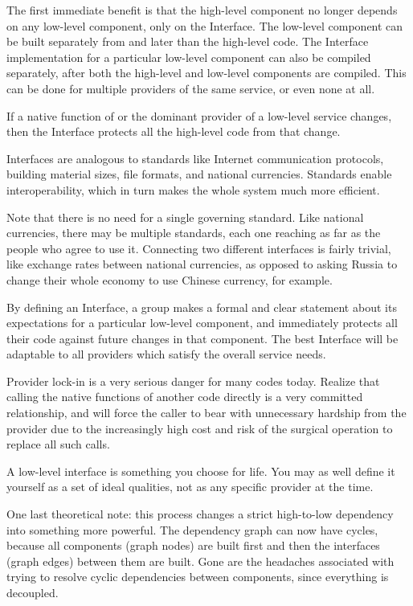\documentclass{article}
\begin{document}
The first immediate benefit is that the high-level component no longer depends
on any low-level component, only on the Interface.
The low-level component can be built separately from and later than
the high-level code.
The Interface implementation for a particular low-level component can also
be compiled separately, after both the high-level and low-level components
are compiled.
This can be done for multiple providers of the same service, or even none at
all.

If a native function of or the dominant provider of a low-level service
changes, then the Interface protects all the high-level code from that change.

Interfaces are analogous to standards like Internet communication
protocols, building material sizes, file formats, and national currencies.
Standards enable interoperability, which in turn makes the whole system
much more efficient.

Note that there is no need for a single governing standard.
Like national currencies, there may be multiple standards, each one reaching
as far as the people who agree to use it.
Connecting two different interfaces is fairly trivial, like exchange rates
between national currencies, as opposed to asking Russia to change their whole
economy to use Chinese currency, for example.

By defining an Interface, a group makes a formal and clear statement about
its expectations for a particular low-level component, and immediately
protects all their code against future changes in that component.
The best Interface will be adaptable to all providers which satisfy
the overall service needs.

Provider lock-in is a very serious danger for many codes today.
Realize that calling the native functions of another code directly is a
very committed relationship, and will force the caller to bear with
unnecessary hardship from the provider due to the increasingly high
cost and risk of the surgical operation to replace all such calls.

A low-level interface is something you choose for life.
You may as well define it yourself as a set of ideal qualities,
not as any specific provider at the time.

One last theoretical note: this process changes a strict high-to-low
dependency into something more powerful.
The dependency graph can now have cycles, because all components (graph nodes)
are built first and then the interfaces (graph edges) between them are built.
Gone are the headaches associated with trying to resolve cyclic dependencies
between components, since everything is decoupled.
\end{document}
